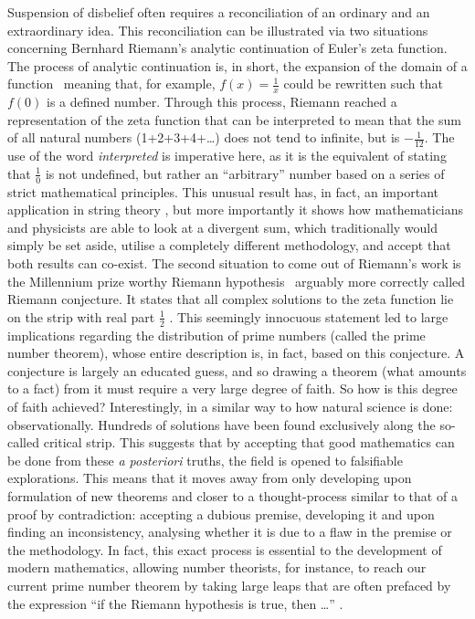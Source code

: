 Suspension of disbelief often requires a reconciliation of an ordinary and an extraordinary idea. This reconciliation can be illustrated via two situations concerning Bernhard Riemann's analytic continuation of Euler's zeta function. The process of analytic continuation is, in short, the expansion of the domain of a function \textendash\ meaning that, for example, $f(x) = \frac{1}{x}$ could be rewritten such that $f(0)$ is a defined number. Through this process, Riemann reached a representation of the zeta function that can be interpreted to mean that the sum of all natural numbers (1+2+3+4+\ldots) does not tend to infinite, but is $-\frac{1}{12}$. The use of the word \textit{interpreted} is imperative here, as it is the equivalent of stating that $\frac{1}{0}$ is not undefined, but rather an ``arbitrary'' number based on a series of strict mathematical principles. This unusual result has, in fact, an important application in string theory \citep[p.22]{Polchinski2005String}, but more importantly it shows how mathematicians and physicists are able to look at a divergent sum, which traditionally would simply be set aside, utilise a completely different methodology, and accept that both results can co-exist. The second situation to come out of Riemann's work is the Millennium prize worthy Riemann hypothesis \textendash\ arguably more correctly called Riemann conjecture. It states that all complex solutions to the zeta function lie on the strip with real part $\frac{1}{2}$ \citep[p.XI]{derbyshire2003prime}. This seemingly innocuous statement led to large implications regarding the distribution of prime numbers (called the prime number theorem), whose entire description is, in fact, based on this conjecture. A conjecture is largely an educated guess, and so drawing a theorem (what amounts to a fact) from it must require a very large degree of faith. So how is this degree of faith achieved? Interestingly, in a similar way to how natural science is done: observationally. Hundreds of solutions have been found exclusively along the so-called critical strip. This suggests that by accepting that good mathematics can be done from these \textit{a posteriori} truths, the field is opened to falsifiable explorations. This means that it moves away from only developing upon formulation of new theorems and closer to a thought-process similar to that of a proof by contradiction: accepting a dubious premise, developing it and upon finding an inconsistency, analysing whether it is due to a flaw in the premise or the methodology. In fact, this exact process is essential to the development of modern mathematics, allowing number theorists, for instance, to reach our current prime number theorem by taking large leaps that are often prefaced by the expression ``if the Riemann hypothesis is true, then \ldots'' \citep[pp.242]{derbyshire2003prime}.

